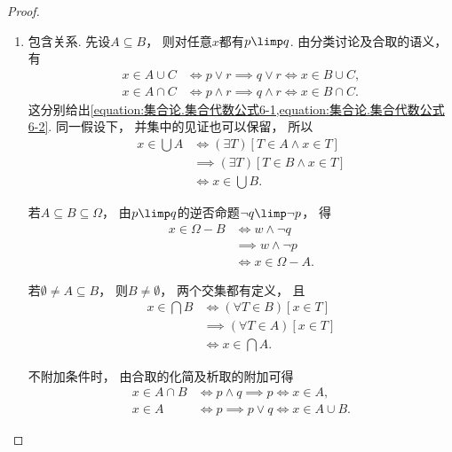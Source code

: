 \begin{property}
\begin{proof}
\begin{enumerate}
            \item 包含关系.
            先设\(A\subseteq B\)，
            则对任意\(x\)都有\(p\limp q\).
            由分类讨论及合取的语义，
            有
            \begin{align*}
                x\in A\cup C
                &\iff p\lor r\implies q\lor r\iff x\in B\cup C, \\
                x\in A\cap C
                &\iff p\land r\implies q\land r\iff x\in B\cap C.
            \end{align*}
            这分别给出\cref{equation:集合论.集合代数公式6-1,equation:集合论.集合代数公式6-2}.
            同一假设下，
            并集中的见证也可以保留，
            所以
            \begin{align*}
                x\in\bigcup A
                &\iff(\exists T)[T\in A\land x\in T] \\
                &\implies(\exists T)[T\in B\land x\in T] \tag{包含关系}\\
                &\iff x\in\bigcup B.
            \end{align*}

            若\(A\subseteq B\subseteq\Omega\)，
            由\(p\limp q\)的逆否命题\(\neg q\limp\neg p\)，
            得
            \begin{align*}
                x\in\Omega-B
                &\iff w\land\neg q \\
                &\implies w\land\neg p \tag{逆否命题}\\
                &\iff x\in\Omega-A.
            \end{align*}

            若\(\emptyset\neq A\subseteq B\)，
            则\(B\neq\emptyset\)，
            两个交集都有定义，
            且
            \begin{align*}
                x\in\bigcap B
                &\iff(\forall T\in B)[x\in T] \\
                &\implies(\forall T\in A)[x\in T] \tag{缩小全称量词的范围}\\
                &\iff x\in\bigcap A.
            \end{align*}

            不附加条件时，
            由合取的化简及析取的附加可得
            \begin{align*}
                x\in A\cap B
                &\iff p\land q\implies p\iff x\in A, \\
                x\in A
                &\iff p\implies p\lor q\iff x\in A\cup B.
            \end{align*}


\end{enumerate}
\end{proof}
\end{property}

